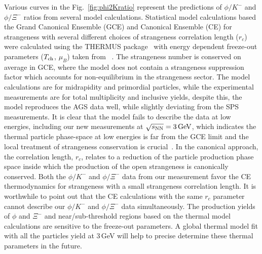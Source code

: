 \documentclass[%
 reprint,	
showpacs,
 amsmath,amssymb,
 aps,
 prc,
]{revtex4-1}
\begin{document}
Various curves in the Fig.~\ref{fig:phi2Kratio} represent the predictions of $\phi/K^-$ and $\phi/\Xi^-$ ratios from several model calculations. Statistical model calculations based the Grand Canonical Ensemble (GCE) and Canonical Ensemble (CE) for strangeness with several different choices of strangeness correlation length ($r_c$) were calculated using the THERMUS package~\cite{THERMUS_WHEATON200984} with energy dependent freeze-out parameters ($T_{\rm ch}$, $\mu_B$) taken from ~\cite{Andronic_2018Naure}. The strangeness number is conserved on average in GCE, where the model does not contain a strangeness suppression factor which accounts for non-equilibrium in the strangeness sector. The model calculations are for midrapidity and primordial particles, while the experimental measurements are for total multiplicity and inclusive yields, despite this, the model reproduces the AGS data well, while slightly deviating from the SPS measurements. It is clear that the model fails to describe the data at low energies, including our new measurements at ${\sqrt{s_{\rm NN}} = \rm{3\,GeV}}$, which indicates the thermal particle phase-space at low energies is far from the GCE limit and the local treatment of strangeness conservation is crucial~\cite{BraunMunzinger:2003zd}. In the canonical approach, the correlation length, $r_c$, relates to a reduction of the particle production phase space inside which the production of the open strangeness is canonically conserved. Both the $\phi/K^-$ and $\phi/\Xi^-$ data from our measurement favor the CE thermodynamics for strangeness with a small strangeness correlation length. It is worthwhile to point out that the CE calculations with the same $r_c$ parameter cannot describe our $\phi/K^-$ and $\phi/\Xi^-$ data simultaneously. The production yields of $\phi$ and $\Xi^-$ and near/sub-threshold regions based on the thermal model calculations are sensitive to the freeze-out parameters. 
A global thermal model fit with all the particles yield at 3\,GeV will help to precise determine these thermal parameters in the future. %
\end{document}
